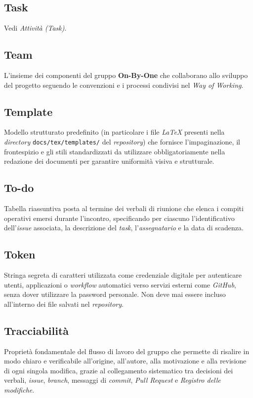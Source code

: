 \documentclass[11pt, a4paper]{article}
\begin{document}
\subsection*{Task}
Vedi \textit{Attività (Task)}.

\subsection*{Team}
L'insieme dei componenti del gruppo \textbf{On-By-One} che collaborano allo sviluppo del progetto seguendo le convenzioni e i processi condivisi nel \textit{Way of Working}.

\subsection*{Template}
Modello strutturato predefinito (in particolare i file \textit{LaTeX} presenti nella \textit{directory} \texttt{docs/tex/templates/} del \textit{repository}) che fornisce l'impaginazione, il frontespizio e gli stili standardizzati da utilizzare obbligatoriamente nella redazione dei documenti per garantire uniformità visiva e strutturale.

\subsection*{To-do}
Tabella riassuntiva posta al termine dei verbali di riunione che elenca i compiti operativi emersi durante l'incontro, specificando per ciascuno l'identificativo dell'\textit{issue} associata, la descrizione del \textit{task}, l'\textit{assegnatario} e la data di scadenza.

\subsection*{Token}
Stringa segreta di caratteri utilizzata come credenziale digitale per autenticare utenti, applicazioni o \textit{workflow} automatici verso servizi esterni come \textit{GitHub}, senza dover utilizzare la password personale. Non deve mai essere incluso all'interno dei file salvati nel \textit{repository}.

\subsection*{Tracciabilità}
Proprietà fondamentale del flusso di lavoro del gruppo che permette di risalire in modo chiaro e verificabile all'origine, all'autore, alla motivazione e alla revisione di ogni singola modifica, grazie al collegamento sistematico tra decisioni dei verbali, \textit{issue}, \textit{branch}, messaggi di \textit{commit}, \textit{Pull Request} e \textit{Registro delle modifiche}.
\end{document}
